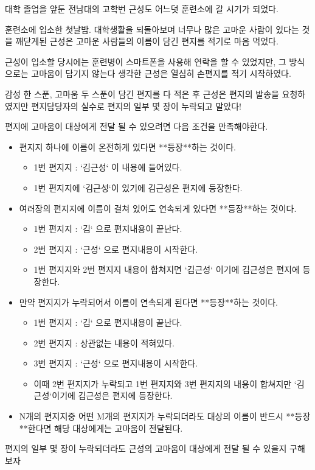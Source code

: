대학 졸업을 앞둔 전남대의 고학번 근성도 어느덧 훈련소에 갈 시기가 되었다.

훈련소에 입소한 첫날밤.  대학생활을 되돌아보며 너무나 많은 고마운 사람이 있다는 것을 깨닫게된 근성은 고마운 사람들의 이름이 담긴 편지를 적기로 마음 먹었다.

근성이 입소할 당시에는 훈련병이 스마트폰을 사용해 연락을 할 수 있었지만, 그 방식으로는 고마움이 담기지 않는다 생각한 근성은 열심히 손편지를 적기 시작하였다. 

감성 한 스푼, 고마움 두 스푼이 담긴 편지를 다 적은 후 근성은 편지의 발송을 요청하였지만 편지담당자의 실수로 편지의 일부 몇 장이 누락되고 말았다!

편지에 고마움이 대상에게 전달 될 수 있으려면 다음 조건을 만족해야한다.

\begin{itemize}
\item 편지지 하나에 이름이 온전하게 있다면 **등장**하는 것이다.
\begin{itemize}
    \item 1번 편지지 : `김근성` 이 내용에 들어있다.
    \item 1번 편지지에 `김근성`이 있기에 김근성은 편지에 등장한다.
\end{itemize}
\item 여러장의 편지지에 이름이 걸쳐 있어도 연속되게 있다면 **등장**하는 것이다.
\begin{itemize}
    \item 1번 편지지 : `김` 으로 편지내용이 끝난다.
    \item 2번 편지지 : `근성` 으로 편지내용이 시작한다.
    \item 1번 편지지와 2번 편지지 내용이 합쳐지면 `김근성` 이기에 김근성은 편지에 등장한다.
\end{itemize}
\item 만약 편지지가 누락되어서 이름이 연속되게 된다면 **등장**하는 것이다.
\begin{itemize}    
    \item 1번 편지지 : `김` 으로 편지내용이 끝난다.
    \item 2번 편지지 : 상관없는 내용이 적혀있다.
    \item 3번 편지지 : `근성` 으로 편지내용이 시작한다.
    \item 이때 2번 편지지가 누락되고 1번 편지지와 3번 편지지의 내용이 합쳐지만 `김근성`이기에 김근성은 편지에 등장한다.
\end{itemize}
\item N개의 편지지중 어떤 M개의 편지지가 누락되더라도 대상의 이름이 반드시 **등장**한다면 해당 대상에게는 고마움이 전달된다.
\end{itemize}

편지의 일부 몇 장이 누락되더라도 근성의 고마움이 대상에게 전달 될 수 있을지 구해보자
